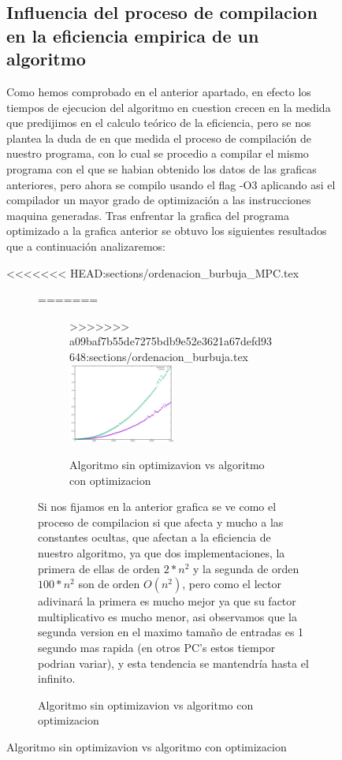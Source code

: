 \begin{figure}[h]
\subsection{Influencia del proceso de compilacion en la eficiencia empirica de un algoritmo}
Como hemos comprobado en el anterior apartado, en efecto los tiempos de ejecucion del algoritmo en cuestion crecen en la medida que predijimos en el calculo teórico de la eficiencia, pero se nos plantea la duda de en que medida el proceso de compilación de nuestro programa, con lo cual se procedio a compilar el mismo programa con el que se habian obtenido los datos de las graficas anteriores, pero ahora se compilo usando el flag -O3 aplicando asi el compilador un mayor grado de optimización a las instrucciones maquina generadas. Tras enfrentar la grafica del programa optimizado a la grafica anterior se obtuvo los siguientes resultados que a continuación analizaremos:

<<<<<<< HEAD:sections/ordenacion_burbuja_MPC.tex
\begin{figure}[h]
=======
\begin{figure}[H]
>>>>>>> a09baf7b55de7275bdb9e52e3621a67defd93648:sections/ordenacion_burbuja.tex
  \centering
  \includegraphics[width=0.5\textwidth]{./Imagenes/burbuja_vs_eficaz.png}
  \caption{Algoritmo sin optimizavion vs algoritmo con optimizacion}
\end{figure}

Si nos fijamos en la anterior grafica se ve como el proceso de compilacion si que afecta y mucho a las constantes ocultas, que afectan a la eficiencia de nuestro algoritmo, ya que dos implementaciones, la primera de ellas de orden $2*n^{2}$ y la segunda de orden $100*n^{2}$ son de orden $O(n^{2})$, pero como el lector adivinará la primera es mucho mejor ya que su factor multiplicativo es mucho menor, asi observamos que la segunda version en el maximo tamaño de entradas es 1 segundo mas rapida (en otros PC's estos tiempor podrian variar), y esta tendencia se mantendría hasta el infinito.


\end{figure}
\end{figure}
